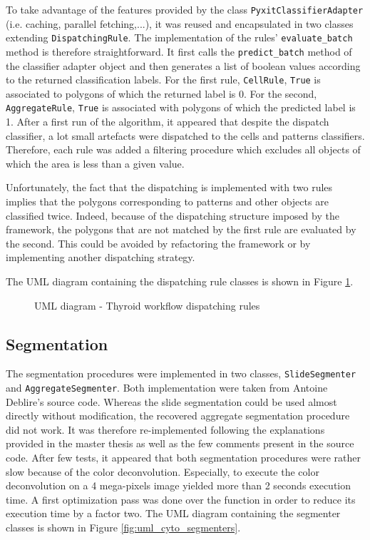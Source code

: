 To take advantage of the features provided by the class \texttt{PyxitClassifierAdapter} (i.e. caching, parallel fetching,...), it was reused and encapsulated in two classes extending \texttt{DispatchingRule}. The implementation of the rules' \texttt{evaluate\_batch} method is therefore straightforward. It first calls the \texttt{predict\_batch} method of the classifier adapter object and then generates a list of boolean values according to the returned classification labels. For the first rule, \texttt{CellRule}, \texttt{True} is associated to polygons of which the returned label is 0. For the second, \texttt{AggregateRule}, \texttt{True} is associated with polygons of which the predicted label is 1. After a first run of the algorithm, it appeared that despite the dispatch classifier, a lot small artefacts were dispatched to the cells and patterns classifiers. Therefore, each rule was added a filtering procedure which excludes all objects of which the area is less than a given value. 

Unfortunately, the fact that the dispatching is implemented with two rules implies that the polygons corresponding to patterns and other objects are classified twice. Indeed, because of the dispatching structure imposed by the framework, the polygons that are not matched by the first rule are evaluated by the second. This could be avoided by refactoring the framework or by implementing another dispatching strategy.

The UML diagram containing the dispatching rule classes is shown in Figure \ref{fig:uml_cyto_disp_rules}.

\begin{figure}
	\center
	\caption{UML diagram - Thyroid workflow dispatching rules}
	\label{fig:uml_cyto_disp_rules}
\end{figure}

\subsection{Segmentation}

The segmentation procedures were implemented in two classes, \texttt{SlideSegmenter} and \texttt{AggregateSegmenter}. Both implementation were taken from Antoine Deblire's source code. Whereas the slide segmentation could be used almost directly without modification, the recovered aggregate segmentation procedure did not work. It was therefore re-implemented following the explanations provided in the master thesis as well as the few comments present in the source code. After few tests, it appeared that both segmentation procedures were rather slow because of the color deconvolution. Especially, to execute the color deconvolution on a 4 mega-pixels image yielded more than 2 seconds execution time. A first optimization pass was done over the function in order to reduce its execution time by a factor two. The UML diagram containing the segmenter classes is shown in Figure \ref{fig:uml_cyto_segmenters}.

